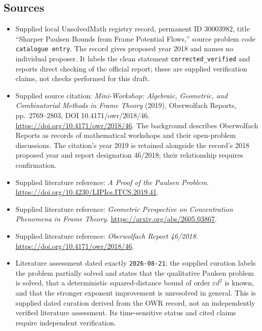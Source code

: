 \documentclass[11pt]{article}
\begin{document}
\subsection{Sources}
\begin{itemize}
\item Supplied local UnsolvedMath registry record, permanent ID \(30003982\), title ``Sharper Paulsen Bounds from Frame Potential Flows,'' source problem code \texttt{catalogue entry}. The record gives proposed year 2018 and names no individual proposer. It labels the clean statement \texttt{corrected\_verified} and reports direct checking of the official report; these are supplied verification claims, not checks performed for this draft.
\item Supplied source citation: \emph{Mini-Workshop: Algebraic, Geometric, and Combinatorial Methods in Frame Theory} (2019), Oberwolfach Reports, pp.~2769--2803, DOI 10.4171/owr/2018/46. \url{https://doi.org/10.4171/owr/2018/46}. The background describes Oberwolfach Reports as records of mathematical workshops and their open-problem discussions. The citation's year 2019 is retained alongside the record's 2018 proposed year and report designation 46/2018; their relationship requires confirmation.
\item Supplied literature reference: \emph{A Proof of the Paulsen Problem}. \url{https://doi.org/10.4230/LIPIcs.ITCS.2019.41}.
\item Supplied literature reference: \emph{Geometric Perspective on Concentration Phenomena in Frame Theory}. \url{https://arxiv.org/abs/2605.03867}.
\item Supplied literature reference: \emph{Oberwolfach Report 46/2018}. \url{https://doi.org/10.4171/owr/2018/46}.
\item Literature assessment dated exactly \texttt{2026-08-21}: the supplied curation labels the problem partially solved and states that the qualitative Paulsen problem is solved, that a deterministic squared-distance bound of order \(\varepsilon d^2\) is known, and that the stronger exponent improvement is unresolved in general. This is supplied dated curation derived from the OWR record, not an independently verified literature assessment. Its time-sensitive status and cited claims require independent verification.
\end{itemize}
\end{document}
